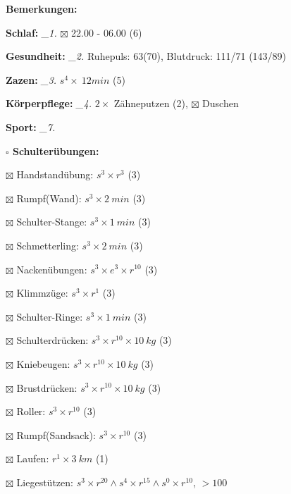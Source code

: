\documentclass[10pt,a4paper]{article}
\newcommand\prop[1] {{\color {alizarin} {\bf #1}}}             %
\newcommand\mand[1] {{\color {burntorange} {\bf #1}}}          %
\newcommand\topspace{\vskip -15pt \hskip 20pt}
\newcommand\n[1] { {\sl #1.} \hskip 5pt }
\begin{document}
\begin{mdframed}[style=daystyle]
  \begin{labeling}{{\mand {Bemerkungen:}}}
    \setlength\itemsep{-3pt}
  \item[{\mand {Schlaf:}}]        \n{\_1} $\boxtimes$ 22.00 - 06.00 (6)
  \item[{\mand {Gesundheit:}}]    \n{\_2} Ruhepuls: 63(70), Blutdruck: 111/71 (143/89)
  \item[{\mand {Zazen:}}]         \n{\_3} $s^4 \times\ 12 min$ (5)
  \item[{\mand {Körperpflege:}}]  \n{\_4} $2 \times$ Zähneputzen (2), $\boxtimes$ Duschen
  \item[{\mand {Sport:}}]         \n{\_7}
    \topspace
    \begin{minipage}{0.75\textwidth}  
      \begin{labeling}{\prop {$\square$ {Schulterübungen:}}} 
        \setlength\itemsep{-3pt}
      \item[$\boxtimes$ Handstandübung:]  $s^3 \times r^{3}$ (3)
      \item[$\boxtimes$ Rumpf(Wand):]     $s^3 \times 2\ min$ (3)
      \item[$\boxtimes$ Schulter-Stange:] $s^3 \times 1\ min$ (3)
      \item[$\boxtimes$ Schmetterling:]   $s^3 \times 2\ min$ (3)
      \item[$\boxtimes$ Nackenübungen:]   $s^3 \times e^3 \times r^{10}$ (3)
      \item[$\boxtimes$ Klimmzüge:]       $s^3 \times r^1$ (3)
      \item[$\boxtimes$ Schulter-Ringe:]  $s^3 \times 1\ min$ (3)
      \item[$\boxtimes$ Schulterdrücken:] $s^3 \times r^{10} \times 10\ kg$ (3)
      \item[$\boxtimes$ Kniebeugen:]      $s^3 \times r^{10} \times 10\ kg$ (3)
      \item[$\boxtimes$ Brustdrücken:]    $s^3 \times r^{10} \times 10\ kg$ (3)
      \item[$\boxtimes$ Roller:]          $s^3 \times r^{10}$ (3)
      \item[$\boxtimes$ Rumpf(Sandsack):] $s^3 \times r^{10}$ (3)
      \item[$\boxtimes$ Laufen:]          $r^1 \times 3\ km$ (1)
      \item[$\boxtimes$ Liegestützen:]    $s^3 \times r^{20} \land s^4 \times r^{15} \land s^0 \times r^{10}$, $> 100$
      \end{labeling}

\end{minipage}
\end{labeling}
\end{mdframed}
\end{document}
